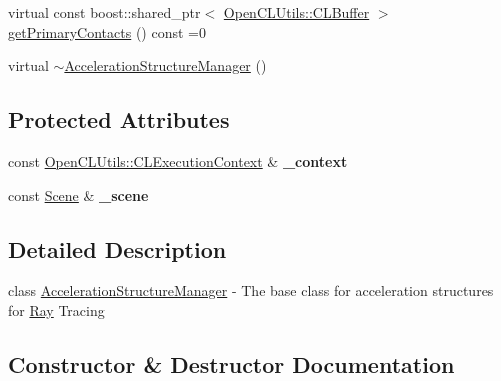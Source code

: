 \begin{DoxyCompactItemize}
\item 
virtual const boost\+::shared\+\_\+ptr$<$ \hyperlink{class_c_l_ray_tracer_1_1_open_c_l_utils_1_1_c_l_buffer}{Open\+C\+L\+Utils\+::\+C\+L\+Buffer} $>$ \hyperlink{class_c_l_ray_tracer_1_1_acceleration_structures_1_1_acceleration_structure_manager_aeaaccc5dde154278325f1596b7bcde31}{get\+Primary\+Contacts} () const  =0
\item 
virtual \hyperlink{class_c_l_ray_tracer_1_1_acceleration_structures_1_1_acceleration_structure_manager_ae8cf037841560eab42f7e24825148dfa}{$\sim$\+Acceleration\+Structure\+Manager} ()
\end{DoxyCompactItemize}
\subsection*{Protected Attributes}
\begin{DoxyCompactItemize}
\item 
const \hyperlink{class_c_l_ray_tracer_1_1_open_c_l_utils_1_1_c_l_execution_context}{Open\+C\+L\+Utils\+::\+C\+L\+Execution\+Context} \& {\bfseries \+\_\+context}\hypertarget{class_c_l_ray_tracer_1_1_acceleration_structures_1_1_acceleration_structure_manager_a4c1c3733109f09d667356d2cf7ebfc02}{}\label{class_c_l_ray_tracer_1_1_acceleration_structures_1_1_acceleration_structure_manager_a4c1c3733109f09d667356d2cf7ebfc02}

\item 
const \hyperlink{class_c_l_ray_tracer_1_1_scene}{Scene} \& {\bfseries \+\_\+scene}\hypertarget{class_c_l_ray_tracer_1_1_acceleration_structures_1_1_acceleration_structure_manager_aed0c1306313fc485bd670ca76173af1c}{}\label{class_c_l_ray_tracer_1_1_acceleration_structures_1_1_acceleration_structure_manager_aed0c1306313fc485bd670ca76173af1c}

\end{DoxyCompactItemize}


\subsection{Detailed Description}
class \hyperlink{class_c_l_ray_tracer_1_1_acceleration_structures_1_1_acceleration_structure_manager}{Acceleration\+Structure\+Manager} -\/ The base class for acceleration structures for \hyperlink{struct_ray}{Ray} Tracing 

\subsection{Constructor \& Destructor Documentation}
